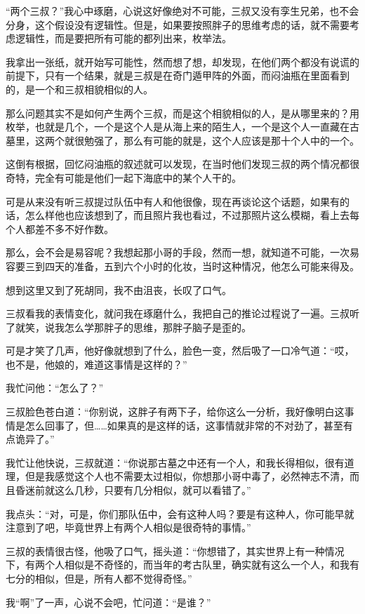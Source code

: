 “两个三叔？”我心中琢磨，心说这好像绝对不可能，三叔又没有孪生兄弟，也不会分身，这个假设没有逻辑性。但是，如果要按照胖子的思维考虑的话，就不需要考虑逻辑性，而是要把所有可能的都列出来，枚举法。

我拿出一张纸，就开始写可能性，然而想了想，却发现，在他们两个都没有说谎的前提下，只有一个结果，就是三叔是在奇门遁甲阵的外面，而闷油瓶在里面看到的，是一个和三叔相貌相似的人。

那么问题其实不是如何产生两个三叔，而是这个相貌相似的人，是从哪里来的？用枚举，也就是几个，一个是这个人是从海上来的陌生人，一个是这个人一直藏在古墓里，这两个就很勉强了，那么有可能的就是，这个人应该是那十个人中的一个。

这倒有根据，回忆闷油瓶的叙述就可以发现，在当时他们发现三叔的两个情况都很奇特，完全有可能是他们一起下海底中的某个人干的。

可是从来没有听三叔提过队伍中有人和他很像，现在再谈论这个话题，如果有的话，怎么样他也应该想到了，而且照片我也看过，不过那照片这么模糊，看上去每个人都差不多不好作数。

那么，会不会是易容呢？我想起那小哥的手段，然而一想，就知道不可能，一次易容要三到四天的准备，五到六个小时的化妆，当时这种情况，他怎么可能来得及。

想到这里又到了死胡同，我不由沮丧，长叹了口气。

三叔看我的表情变化，就问我在琢磨什么，我把自己的推论过程说了一遍。三叔听了就笑，说我怎么学那胖子的思维，那胖子脑子是歪的。

可是才笑了几声，他好像就想到了什么，脸色一变，然后吸了一口冷气道：“哎，也不是，他娘的，难道这事情是这样的？”

我忙问他：“怎么了？”

三叔脸色苍白道：“你别说，这胖子有两下子，给你这么一分析，我好像明白这事情是怎么回事了，但……如果真的是这样的话，这事情就非常的不对劲了，甚至有点诡异了。”

我忙让他快说，三叔就道：“你说那古墓之中还有一个人，和我长得相似，很有道理，但是我感觉这个人也不需要太过相似，你想那小哥中毒了，必然神志不清，而且昏迷前就这么几秒，只要有几分相似，就可以看错了。”

我点头：“对，可是，你们那队伍中，会有这种人吗？要是有这种人，你可能早就注意到了吧，毕竟世界上有两个人相似是很奇特的事情。”

三叔的表情很古怪，他吸了口气，摇头道：“你想错了，其实世界上有一种情况下，有两个人相似是不奇怪的，而当年的考古队里，确实就有这么一个人，和我有七分的相似，但是，所有人都不觉得奇怪。”

我“啊”了一声，心说不会吧，忙问道：“是谁？”

